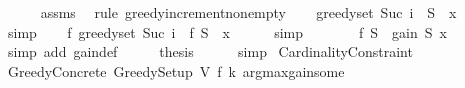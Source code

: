\begin{isabellebody}
\ \ \ \ \isamarkupfalse%
\ assms\ \isamarkupfalse%
\ {\isacharparenleft}{\kern0pt}rule\ greedy{\isacharunderscore}{\kern0pt}increment{\isacharunderscore}{\kern0pt}nonempty{\isacharparenright}{\kern0pt}\isanewline
\isanewline
\ \ \isamarkupfalse%
\ {\isachardoublequoteopen}greedy{\isacharunderscore}{\kern0pt}set\ {\isacharparenleft}{\kern0pt}Suc\ i{\isacharparenright}{\kern0pt}\ {\isacharequal}{\kern0pt}\ {\isacharquery}{\kern0pt}S\ {\isasymunion}\ {\isacharbraceleft}{\kern0pt}{\isacharquery}{\kern0pt}x{\isacharbraceright}{\kern0pt}{\isachardoublequoteclose}\isanewline
\ \ \ \ \isamarkupfalse%
\ simp\isanewline
\isanewline
\ \ \isamarkupfalse%
\ {\isachardoublequoteopen}f\ {\isacharparenleft}{\kern0pt}greedy{\isacharunderscore}{\kern0pt}set\ {\isacharparenleft}{\kern0pt}Suc\ i{\isacharparenright}{\kern0pt}{\isacharparenright}{\kern0pt}\ {\isacharequal}{\kern0pt}\ f\ {\isacharparenleft}{\kern0pt}{\isacharquery}{\kern0pt}S\ {\isasymunion}\ {\isacharbraceleft}{\kern0pt}{\isacharquery}{\kern0pt}x{\isacharbraceright}{\kern0pt}{\isacharparenright}{\kern0pt}{\isachardoublequoteclose}\isanewline
\ \ \ \ \isamarkupfalse%
\ simp\isanewline
\ \ \isamarkupfalse%
\ \isamarkupfalse%
\ {\isachardoublequoteopen}{\isasymdots}\ {\isacharequal}{\kern0pt}\ f\ {\isacharquery}{\kern0pt}S\ {\isacharplus}{\kern0pt}\ gain\ {\isacharquery}{\kern0pt}S\ {\isacharquery}{\kern0pt}x{\isachardoublequoteclose}\isanewline
\ \ \ \ \isamarkupfalse%
\ {\isacharparenleft}{\kern0pt}simp\ add{\isacharcolon}{\kern0pt}\ gain{\isacharunderscore}{\kern0pt}def{\isacharparenright}{\kern0pt}\isanewline
\ \ \isamarkupfalse%
\ \isamarkupfalse%
\ {\isacharquery}{\kern0pt}thesis\isanewline
\ \ \ \ \isamarkupfalse%
\ simp\isanewline
{}\isamarkupfalse%
%
\endisatagproof
{\isafoldproof}%
%
\isadelimproof
\isanewline
%
\endisadelimproof
\isanewline
{}\isamarkupfalse%
\isanewline
\isanewline
{}\isamarkupfalse%
\ Cardinality{\isacharunderscore}{\kern0pt}Constraint\isanewline
{}\isanewline
\isanewline
{}\isamarkupfalse%
\ Greedy{\isacharunderscore}{\kern0pt}Concrete{\isacharcolon}{\kern0pt}\ Greedy{\isacharunderscore}{\kern0pt}Setup\ V\ f\ k\ argmax{\isacharunderscore}{\kern0pt}gain{\isacharunderscore}{\kern0pt}some\isanewline
%
\isadelimproof
%
\endisadelimproof
%
\isatagproof

\end{isabellebody}
